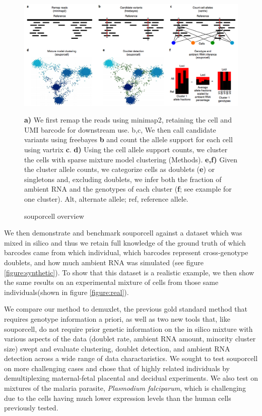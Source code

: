 \begin{figure}[th!]


\begin{centering}
\caption{souporcell overview}\label{fig:souporcell}

\includegraphics[width=\textwidth]{main.png} 

\par{\textbf{a)} We first remap the reads using minimap2, retaining the cell and UMI barcode for downstream use. b,c, We then call
candidate variants using freebayes \textbf{b} and count the allele support for each cell using vartrix \textbf{c}. \textbf{d)} Using the cell allele support counts, we cluster the cells with sparse mixture model clustering (Methods). \textbf{e,f)} Given the cluster allele counts, we categorize cells as doublets (\textbf{e}) or singletons and,
excluding doublets, we infer both the fraction of ambient RNA and the genotypes of each cluster (\textbf{f}; see example for one cluster). Alt, alternate allele;
ref, reference allele.}
\end{centering}
\end{figure}
\par{
We then demonstrate and benchmark souporcell against a dataset which was mixed in silico and thus we retain full knowledge of the ground truth of which barcodes came from which individual, which barcodes represent cross-genotype doublets, and how much ambient RNA was simulated (see figure \ref{figure:synthetic}). To show that this dataset is a realistic example, we then show the same results on an experimental mixture of cells from those same individuals(shown in figure \ref{figure:real}).
} \\
\par{
We compare our method to demuxlet, the previous gold standard method that requires genotype information a priori, as well as two new tools that, like souporcell, do not require prior genetic information\cite{vireo}\cite{scsplit} on the in silico mixture with various aspects of the data (doublet rate, ambient RNA amount, minority cluster size) swept and evaluate clustering, doublet detection, and ambient RNA detection across a wide range of data charactaristics. We sought to test souporcell on more challenging cases and chose that of highly related individuals by demultiplexing maternal-fetal placental and decidual experiments. We also test on mixtures of the malaria parasite, \textit{Plasmodium falciparum}, which is challenging due to the cells having much lower expression levels than the human cells previously tested.
} \\
